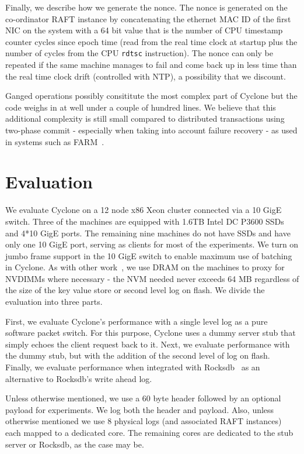 \documentclass[pageno]{jpaper}
\begin{document}
Finally, we describe how we generate the nonce. The nonce is generated on the
co-ordinator RAFT instance by concatenating the ethernet MAC ID of the first NIC
on the system with a 64 bit value that is the number of CPU timestamp counter
cycles since epoch time (read from the real time clock at startup plus the
number of cycles from the CPU {\tt rdtsc} instruction). The nonce can only be
repeated if the same machine manages to fail and come back up in less time than
the real time clock drift (controlled with NTP), a possibility that we discount.

Ganged operations possibly consititute the most complex part of Cyclone but the
code weighs in at well under a couple of hundred lines. We believe that
this additional complexity is still small compared to distributed transactions
using two-phase commit - especially when taking into account failure recovery -
as used in systems such as FARM~\cite{farm}.

\section{Evaluation}
\label{sec:evaluation}
We evaluate Cyclone on a 12 node x86 Xeon cluster connected via a 10 GigE
switch. Three of the machines are equipped with 1.6TB Intel DC P3600 SSDs and
4*10 GigE ports. The remaining nine machines do not have SSDs and have only one
10 GigE port, serving as clients for most of the experiments. We turn on jumbo
frame support in the 10 GigE switch to enable maximum use of batching in
Cyclone. As with other work~\cite{faast}, we use DRAM on the machines to proxy
for NVDIMMs where necessary - the NVM needed never exceeds 64 MB
regardless of the size of the key value store or second level log on flash. We
divide the evaluation into three parts.

First, we evaluate Cyclone's performance with a single level log as a pure
software packet switch. For this purpose, Cyclone uses a dummy server stub that
simply echoes the client request back to it. Next, we evaluate
performance with the dummy stub, but with the addition of the second level of log
on flash. Finally, we evaluate performance when integrated with
Rocksdb~\cite{rocksdb} as an alternative to Rocksdb's write ahead log.

Unless otherwise mentioned, we use a 60 byte header followed by an optional
payload for experiments. We log both the header and payload. Also, unless
otherwise mentioned we use 8 physical logs (and associated RAFT instances) each
mapped to a dedicated core. The remaining cores are dedicated to the stub
server or Rocksdb, as the case may be.
\end{document}
